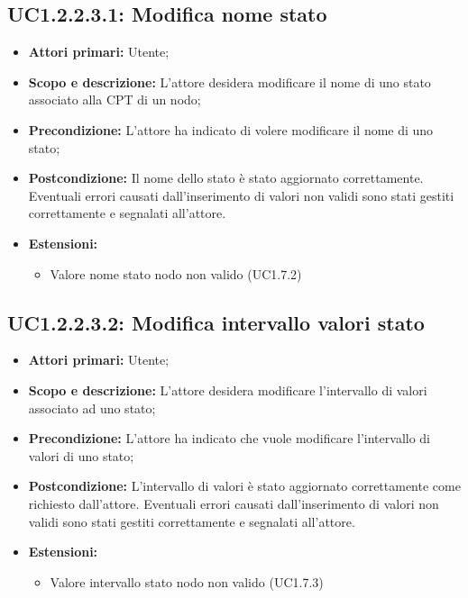 \subsection{UC1.2.2.3.1: Modifica nome stato} 
\begin{itemize} 
	\item{\textbf{Attori primari:} Utente;} 
	\item{\textbf{Scopo e descrizione:} L'attore desidera modificare il nome di uno stato associato alla CPT di un nodo;} 
	\item{\textbf{Precondizione:} L'attore ha indicato di volere modificare il nome di uno stato;} 
	\item{\textbf{Postcondizione:} Il nome dello stato è stato aggiornato correttamente. Eventuali errori causati dall'inserimento di valori non validi sono stati gestiti correttamente e segnalati all'attore.}
	\item{\textbf{Estensioni:}
		\begin{itemize}
			\item{Valore nome stato nodo non valido (UC1.7.2)}
		\end{itemize}
	}
\end{itemize} 
\subsection{UC1.2.2.3.2: Modifica intervallo valori stato} 
\begin{itemize} 
	\item{\textbf{Attori primari:} Utente;} 
	\item{\textbf{Scopo e descrizione:} L'attore desidera modificare l'intervallo di valori associato ad uno stato;} 
	\item{\textbf{Precondizione:} L'attore ha indicato che vuole modificare l'intervallo di valori di uno stato;} 
	\item{\textbf{Postcondizione:} L'intervallo di valori è stato aggiornato correttamente come richiesto dall'attore. Eventuali errori causati dall'inserimento di valori non validi sono stati gestiti correttamente e segnalati all'attore.}
	\item{\textbf{Estensioni:}
		\begin{itemize}
			\item{Valore intervallo stato nodo non valido (UC1.7.3)}
		\end{itemize}
	}
\end{itemize} 
